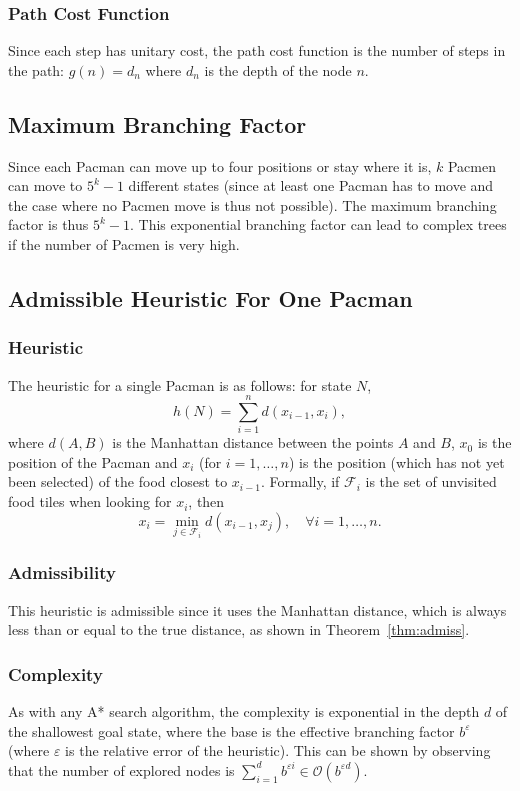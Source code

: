 \documentclass[journal]{IEEEtran}
\begin{document}
\subsubsection{Path Cost Function}
Since each step has unitary cost, the path cost function is the number of steps in the path: $g(n) = d_n$ where $d_n$ is the depth of the node $n$.


\subsection{Maximum Branching Factor}
Since each Pacman can move up to four positions or stay where it is, $k$ Pacmen can move to $5^k-1$ different states (since at least one Pacman has to move and the case where no Pacmen move is thus not possible).
The maximum branching factor is thus $5^k-1$.
This exponential branching factor can lead to complex trees if the number of Pacmen is very high.


\subsection{Admissible Heuristic For One Pacman}
\subsubsection{Heuristic}
The heuristic for a single Pacman is as follows: for state $N$,
\[
 h(N) = \sum_{i=1}^n d(x_{i-1},x_i),
\]
where $d(A,B)$ is the Manhattan distance between the points $A$ and $B$, $x_0$ is the position of the Pacman and $x_i$ (for \(i = 1, \ldots, n\)) is the position (which has not yet been selected) of the food closest to $x_{i-1}$.
Formally, if \(\mathscr{F}_i\) is the set of  unvisited food tiles when looking for \(x_i\), then
\[
x_{i} = \min_{j \in \mathscr{F}_i} d(x_{i-1}, x_j), \quad \forall i = 1, \ldots, n.
\]

\subsubsection{Admissibility}
This heuristic is admissible since it uses the Manhattan distance, which is always less than or equal to the true distance, as shown in Theorem~\ref{thm:admiss}.

\subsubsection{Complexity}
As with any A* search algorithm, the complexity is exponential in the depth \(d\) of the shallowest goal state, where the base is the effective branching factor \(b^\varepsilon\) (where \(\varepsilon\) is the relative error of the heuristic).
This can be shown by observing that the number of explored nodes is \(\sum_{i=1}^d b^{\varepsilon i} \in \mathcal{O}(b^{\varepsilon d})\).
\end{document}

